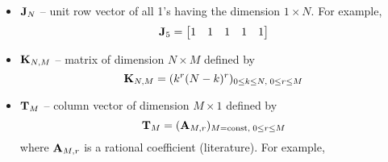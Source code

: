 ﻿\begin{itemize}
    \item ${\mathbf{J}} \sb{N}$ -- unit row vector of all 1's having the dimension $1 \times N$.
    For example,
    \[
        {\mathbf{J}} \sb{5} =
        \begin{bmatrix}
            1 & 1 & 1 & 1 & 1
        \end{bmatrix}
    \]
    \item ${\mathbf{K}} \sb{N, M}$ -- matrix of dimension $N \times M$ defined by
    \[
        {\mathbf{K}} \sb{N, M} = (k^r (N-k)^r)_{0 \leq k \leq N, \; 0 \leq r \leq M}
    \]
    \item ${\mathbf{T}} \sb{M}$ -- column vector of dimension $M \times 1$ defined by
    \[
        {\mathbf{T}} \sb{M} = ({\mathbf{A}} \sb{M,r})_{M=\mathrm{const}, \; 0 \leq r \leq M}
    \]
    where ${\mathbf{A}} \sb{M,r}$ is a rational coefficient (literature).
    For example,
\end{itemize}
